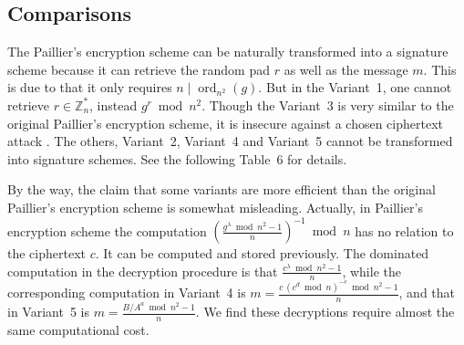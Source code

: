 \documentclass[11pt,a4paper]{article}
\theoremstyle{remark}
\newcommand{\Z}{\mathbb{Z}}
\newcommand{\ord}{\operatorname{ord}}
\begin{document}
\subsection{Comparisons}

The Paillier's encryption scheme can be naturally transformed into a signature scheme because it can retrieve the random pad $r$ as well as the message $m$. This is due to that it only requires $n\mid\ord_{n^2}(g)$. But in the Variant~1, one cannot retrieve $r\in\Z_n^*$, instead $g^r \bmod n^2$. Though the Variant~3 is very similar to the original Paillier's encryption scheme, it is insecure against a chosen ciphertext attack \cite{ST02}. The others, Variant~2, Variant~4 and Variant~5 cannot be transformed into signature schemes. See the following Table~6 for details.

By the way, the claim that some variants are more efficient than the original Paillier's encryption scheme is somewhat misleading. Actually, in Paillier's encryption scheme the computation $\left(\frac{g^\lambda \bmod n^2 - 1}{n}\right)^{-1} \bmod n$ has no relation to the ciphertext $c$. It can be computed and stored previously. The dominated computation in the decryption procedure is that $\frac{c^\lambda \bmod n^2 - 1}{n}$, while the corresponding computation in Variant~4 is $m = \frac{c\,(c^d \bmod n)^{-e} \bmod n^2 - 1}{n}$, and that in Variant~5 is $m = \frac{B/A^a \bmod n^2 - 1}{n}$. We find these decryptions require almost the same computational cost.
\end{document}
